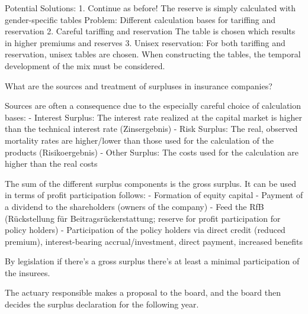 \documentclass[11pt,a4paper,twoside]{article}
\begin{document}
Potential Solutions:
1. Continue as before!
The reserve is simply calculated with gender-specific tables
Problem: Different calculation bases for tariffing and reservation
2. Careful tariffing and reservation
The table is chosen which results in higher premiums and reserves
3. Unisex reservation:
For both tariffing and reservation, unisex tables are chosen.
When constructing the tables, the temporal development of the mix must be considered.


What are the sources and treatment of surpluses in insurance companies?

Sources are often a consequence due to the especially careful choice of calculation bases:
- Interest Surplus: The interest rate realized at the capital market is higher than the
technical interest rate (Zinsergebnis)
- Risk Surplus: The real, observed mortality rates are higher/lower than those used for the
calculation of the products (Risikoergebnis)
- Other Surplus: The costs used for the calculation are higher than the real costs

The sum of the different surplus components is the gross surplus. It can be used in terms of profit participation follows:
- Formation of equity capital
- Payment of a dividend to the shareholders (owners of the company)
- Feed the RfB (Rückstellung für Beitragsrückerstattung; reserve for profit participation for policy holders)
- Participation of the policy holders via direct credit (reduced premium), interest-bearing accrual/investment, direct payment, increased benefits

By legislation if there's a gross surplus there's at least a minimal participation of the insurees.

The actuary responsible makes a proposal to the board, and the board then decides the surplus
declaration for the following year.
\end{document}
